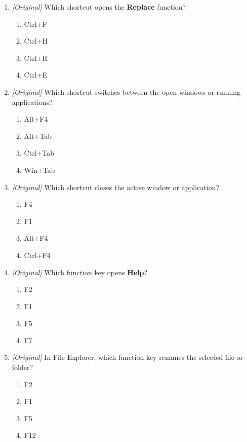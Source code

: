 \documentclass[11pt]{article}
\begin{document}
\begin{enumerate}[label=\textbf{Q\arabic*.}, leftmargin=*]
\begin{enumerate}[label=\Alph*.]
    \item Ctrl+N
    \item Ctrl+F
    \item Ctrl+G
  \end{enumerate}
\item \textit{[Original]} Which shortcut opens the \textbf{Replace} function?
  \begin{enumerate}[label=\Alph*.]
    \item Ctrl+F
    \item Ctrl+H
    \item Ctrl+R
    \item Ctrl+E
  \end{enumerate}
\item \textit{[Original]} Which shortcut switches between the open windows or
  running applications?
  \begin{enumerate}[label=\Alph*.]
    \item Alt+F4
    \item Alt+Tab
    \item Ctrl+Tab
    \item Win+Tab
  \end{enumerate}
\item \textit{[Original]} Which shortcut closes the active window or
  application?
  \begin{enumerate}[label=\Alph*.]
    \item F4
    \item F1
    \item Alt+F4
    \item Ctrl+F4
  \end{enumerate}
\item \textit{[Original]} Which function key opens \textbf{Help}?
  \begin{enumerate}[label=\Alph*.]
    \item F2
    \item F1
    \item F5
    \item F7
  \end{enumerate}
\item \textit{[Original]} In File Explorer, which function key renames the
  selected file or folder?
  \begin{enumerate}[label=\Alph*.]
    \item F2
    \item F1
    \item F5
    \item F12
  \end{enumerate}

\end{enumerate}
\end{document}
